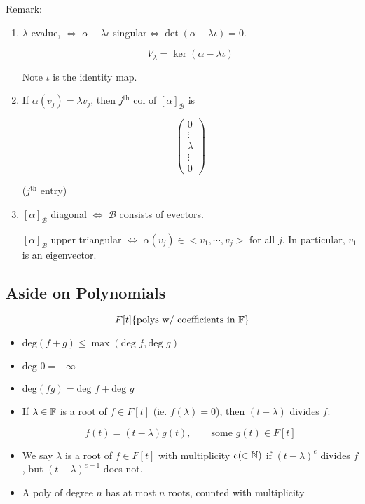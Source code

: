 \documentclass[a4paper]{article}
\begin{document}
Remark: \begin{enumerate}
	\item $ \lambda $ evalue, $ \iff $ $ \alpha - \lambda \iota $ singular$ \iff \det(\alpha - \lambda \iota ) = 0$. 
	
	\[ V_{\lambda} = \ker(\alpha - \lambda \iota) \]
	
	Note $ \iota $ is the identity map.
	
	\item If $ \alpha(v_{j}) = \lambda v_{j} $, then $ j^{\text{th}} $ col of $ [\alpha]_{\mathcal{B}} $ is 
	
	\[ \begin{pmatrix}
	0\\
	\vdots\\
	\lambda\\
	\vdots\\
	0
	\end{pmatrix} \]
	
	($ j^{\text{th}} $ entry)
	
	\item  $ [\alpha]_{\mathcal{B}} $ diagonal $ \iff $ $ \mathcal{B} $ consists of evectors.
	
	$ [\alpha]_{\mathcal{B}} $ upper triangular $ \iff $ $ \alpha(v_{j}) \in < v_{1},\cdots,v_{j} >  $ for all $ j $. In particular, $ v_{1} $ is an eigenvector.
	
\end{enumerate}

\subsection{Aside on Polynomials}

\[ F[t] \{ \text{polys w/  coefficients in } \mathbb{F} \} \]

\begin{itemize}
	\item $ \text{deg}(f+g) \leq \max(\text{deg } f, \text{deg } g) $
	\item $ \text{deg } 0 = - \infty $
	\item $ \text{deg}(fg) = \text{deg } f + \text{deg } g $
	\item If $ \lambda \in \mathbb{F} $ is a root of $ f \in F[t] $ (ie. $ f(\lambda) = 0 $), then $ (t - \lambda) $ divides $ f $: 
	
	\[ f(t) = (t - \lambda) g(t), \qquad \text{some } g(t) \in F[t] \]
	
	\item We say $ \lambda $ is a root of $ f \in F[t] $ with multiplicity $ e (\in \mathbb{N}) $ if $ (t - \lambda)^{e} $ divides $ f $, but $ (t - \lambda)^{e + 1} $ does not. 
	\item A poly of degree $ n $ has at most $ n $ roots, counted with multiplicity 
\end{itemize}
\end{document}
